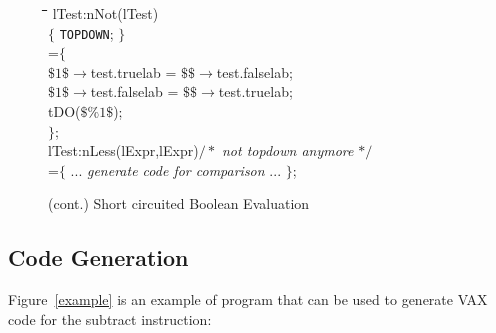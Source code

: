 \addtocounter{figure}{-1}
\begin{figure}[tp]
\begin{tabbing}
\hspace{1in}\=\hspace{1in}\=\hspace{1in}\=\hspace{1in}\=
\hspace{1in}\=\hspace{1in}\=\hspace{1in}\=\hspace{1in}\=\kill
lTest:\>nNot(lTest)\\
\>$\{$ {\tt TOPDOWN}; $\}$\\
\>=$\{$\\
\>\>$\$1\$\to$test.truelab = $\$\$\to$test.falselab;\\
\>\>$\$1\$\to$test.falselab = $\$\$\to$test.truelab;\\
\>\>tDO($\$\%1\$$);\\
\>$\}$;\\[4pt]
lTest:\>nLess(lExpr,lExpr)\>\>$/*$ {\sl not topdown anymore } $*/$\\
\>=$\{$ $...$ {\sl generate code for comparison } $...$ $\}$;\\
\end{tabbing}
\caption{(cont.) Short circuited Boolean Evaluation}
\end{figure}

\subsection{Code Generation}

Figure~\ref{example} is an 
example of \twiglang{} program that
can be used to generate VAX code for
the subtract instruction:

